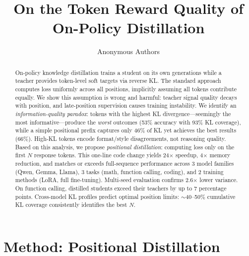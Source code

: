 \documentclass[10pt]{article}
\title{\textbf{On the Token Reward Quality of On-Policy Distillation}}
\author{
  Anonymous Authors
}
\date{}
\begin{document}
\maketitle

\begin{abstract}
On-policy knowledge distillation trains a student on its own generations while a teacher provides token-level soft targets via reverse KL. The standard approach computes loss uniformly across all positions, implicitly assuming all tokens contribute equally. We show this assumption is wrong and harmful: teacher signal quality decays with position, and late-position supervision causes training instability. We identify an \emph{information-quality paradox}: tokens with the highest KL divergence---seemingly the most informative---produce the \emph{worst} outcomes (53\% accuracy with 93\% KL coverage), while a simple positional prefix captures only 46\% of KL yet achieves the best results (66\%). High-KL tokens encode format/style disagreements, not reasoning quality. Based on this analysis, we propose \emph{positional distillation}: computing loss only on the first $N$ response tokens. This one-line code change yields 24$\times$ speedup, 4$\times$ memory reduction, and matches or exceeds full-sequence performance across 3 model families (Qwen, Gemma, Llama), 3 tasks (math, function calling, coding), and 2 training methods (LoRA, full fine-tuning). Multi-seed evaluation confirms 2.6$\times$ lower variance. On function calling, distilled students exceed their teachers by up to 7 percentage points. Cross-model KL profiles predict optimal position limits: $\sim$40--50\% cumulative KL coverage consistently identifies the best $N$.
\end{abstract}



\section{Method: Positional Distillation}
\label{sec:method}
\end{document}
